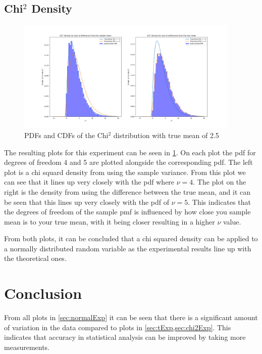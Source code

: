 \documentclass[a4paper, 12pt]{article}
\begin{document}
        \subsection{Chi$^{2}$ Density} \label{sec:chi2Exp}
            \begin{figure}
                \centering
                \includegraphics[width=0.95\textwidth]{chiSquared.png}
                \caption{PDFs and CDFs of the Chi$^2$ distribution with true mean of 2.5}
                \label{fig:chi2}
            \end{figure}
            The resulting plots for this experiment can be seen in \cref{fig:chi2}. On each plot the pdf for degrees of freedom 4 and 5 are plotted alongside the corresponding pdf. The left plot is a chi squard density from using the sample variance. From this plot we can see that it lines up very closely with the pdf where $\nu = 4$. The plot on the right is the density from using the difference between the true mean, and it can be seen that this lines up very closely with the pdf of $\nu = 5$. This indicates that the degrees of freedom of the sample pmf is influenced by how close you sample mean is to your true mean, with it being closer resulting in a higher $\nu$ value.
            \par
            From both plots, it can be concluded that a chi squared density can be applied to a normally distributed random variable as the experimental results line up with the theoretical ones.
    \section{Conclusion}
        From all plots in \cref{sec:normalExp} it can be seen that there is a significant amount of variation in the data compared to plots in \cref{sec:tExp,sec:chi2Exp}. This indicates that accuracy in statistical analysis can be improved by taking more measurements.
    
    
\end{document}
